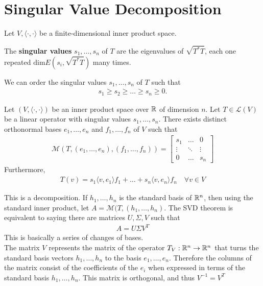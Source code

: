 \documentclass{memoir}
\begin{document}
\section{Singular Value Decomposition}
\label{cha:singular_value_decomposition}
Let \(V, \langle \cdot, \cdot \rangle \) be a finite-dimensional inner product space.

\begin{defn}
	The \textbf{singular values} \(s_1,\ldots,s_n\) of \(T\) are the eigenvalues of \(\sqrt{T^{*}T} \), each one repeated \( \textrm{dim}E(s_i,\sqrt{T^{*}T} )\) many times.
\end{defn}
We can order the singular values \(s_1,\ldots,s_n\) of \(T\) such that
\begin{align*}
	s_1\geq s_2\geq \ldots\geq s_n\geq 0.
\end{align*}
\begin{thm}
	Let \((V, \langle \cdot, \cdot \rangle )\) be an inner product space over \(\mathbb{R}\) of dimension \(n\). Let \(T \in \mathcal{L}(V)\) be a linear operator with singular values \(s_1,\ldots,s_n\). There exists distinct orthonormal bases \(e_1,\ldots,e_n\) and \(f_1,\ldots,f_n\) of \(V\) such that
	\begin{align*}
		\mathcal{M}(T,(e_1,\ldots,e_n),(f_1,\ldots,f_n)) = \begin{bmatrix} s_1 & \ldots & 0 \\ \vdots & \ddots & \vdots \\ 0 & \ldots & s_n \end{bmatrix} 
	\end{align*}
Furthermore,
\begin{align*}
	T(v) = s_1 \langle v, e_1 \rangle f_1 + \ldots + s_n \langle v, e_n \rangle f_n \quad \forall v \in V
\end{align*}
\end{thm}
This is a decomposition. If \(h_1,\ldots,h_n\) is the standard basis of \(\mathbb{R}^{n}\), then using the standard inner product, let \(A = \mathcal{M}(T,(h_1,\ldots,h_n)\). The SVD theorem is equivalent to saying there are matrices \(U,\Sigma,V\) such that
\begin{align*}
	A = U\Sigma V^T
\end{align*}
This is basically a series of changes of bases.\\

The matrix \(V\) represents the matrix of the operator \(T_V: \mathbb{R}^{n}\to \mathbb{R}^{n}\) that turns the standard basis vectors \(h_1,\ldots,h_n\) to the basis \(e_1,\ldots,e_n\). Therefore the columns of the matrix consist of the coefficients of the \(e_i\) when expressed in terms of the standard basis \(h_1,\ldots,h_n\). This matrix is orthogonal, and thus \(V^{-1}=V^{T}\)\\
\end{document}
